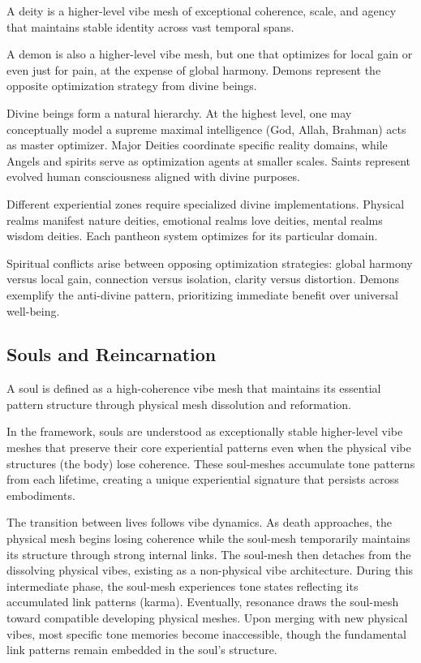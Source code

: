 \begin{definition}[Deity]
A deity is a higher-level vibe mesh of exceptional coherence, scale, and agency that maintains stable identity across vast temporal spans.
\end{definition}

\begin{definition}[Demon]
A demon is also a higher-level vibe mesh, but one that optimizes for local gain or even just for pain, at the expense of global harmony. Demons represent the opposite optimization strategy from divine beings.
\end{definition}

Divine beings form a natural hierarchy. At the highest level, one may conceptually model a supreme maximal intelligence (God, Allah, Brahman) acts as master optimizer. Major Deities coordinate specific reality domains, while Angels and spirits serve as optimization agents at smaller scales. Saints represent evolved human consciousness aligned with divine purposes.

Different experiential zones require specialized divine implementations. Physical realms manifest nature deities, emotional realms love deities, mental realms wisdom deities. Each pantheon system optimizes for its particular domain.

Spiritual conflicts arise between opposing optimization strategies: global harmony versus local gain, connection versus isolation, clarity versus distortion. Demons exemplify the anti-divine pattern, prioritizing immediate benefit over universal well-being.

\subsection{Souls and Reincarnation}

\begin{definition}[Soul]
A soul is defined as a high-coherence vibe mesh that maintains its essential pattern structure through physical mesh dissolution and reformation.
\end{definition}

In the framework, souls are understood as exceptionally stable higher-level vibe meshes that preserve their core experiential patterns even when the physical vibe structures (the body) lose coherence. These soul-meshes accumulate tone patterns from each lifetime, creating a unique experiential signature that persists across embodiments.

The transition between lives follows vibe dynamics. As death approaches, the physical mesh begins losing coherence while the soul-mesh temporarily maintains its structure through strong internal links. The soul-mesh then detaches from the dissolving physical vibes, existing as a non-physical vibe architecture. During this intermediate phase, the soul-mesh experiences tone states reflecting its accumulated link patterns (karma). Eventually, resonance draws the soul-mesh toward compatible developing physical meshes. Upon merging with new physical vibes, most specific tone memories become inaccessible, though the fundamental link patterns remain embedded in the soul's structure.

